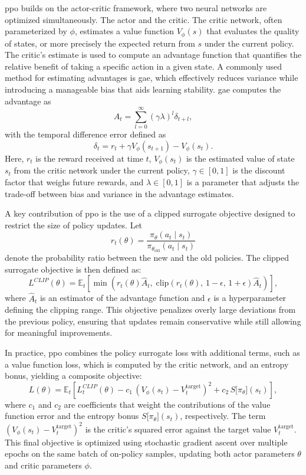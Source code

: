 \gls{ppo} builds on the actor-critic framework, where two neural networks are optimized simultaneously. The actor and the critic. The critic network, often parameterized by \(\phi\), estimates a value function \(V_\phi(s)\) that evaluates the quality of states, or more precisely the expected return from \(s\) under the current policy. The critic's estimate is used to compute an advantage function that quantifies the relative benefit of taking a specific action in a given state. A commonly used method for estimating advantages is \gls{gae}, which effectively reduces variance while introducing a manageable bias that aids learning stability. \gls{gae} computes the advantage as
\[
\hat{A}_t = \sum_{l=0}^{\infty} (\gamma \lambda)^l \delta_{t+l},
\]
with the temporal difference error defined as
\[
\delta_t = r_t + \gamma V_\phi(s_{t+1}) - V_\phi(s_t).
\]
Here, \(r_t\) is the reward received at time \(t\), \(V_\phi(s_t)\) is the estimated value of state \(s_t\) from the critic network under the current policy, \(\gamma \in [0,1]\) is the discount factor that weighs future rewards, and \(\lambda \in [0,1]\) is a parameter that adjusts the trade-off between bias and variance in the advantage estimates.

A key contribution of \gls{ppo} is the use of a clipped surrogate objective designed to restrict the size of policy updates. Let
\[
r_t(\theta) = \frac{\pi_\theta(a_t \mid s_t)}{\pi_{\theta_{\text{old}}}(a_t \mid s_t)}
\]
denote the probability ratio between the new and the old policies. The clipped surrogate objective is then defined as:
\[
L^{CLIP}(\theta) = \mathbb{E}_t\!\left[\min\!\left(r_t(\theta)\hat{A}_t,\;\text{clip}\left(r_t(\theta),\,1-\epsilon,\,1+\epsilon\right)\hat{A}_t\right)\right],
\]
where \(\hat{A}_t\) is an estimator of the advantage function and \(\epsilon\) is a hyperparameter defining the clipping range. This objective penalizes overly large deviations from the previous policy, ensuring that updates remain conservative while still allowing for meaningful improvements.

In practice, \gls{ppo} combines the policy surrogate loss with additional terms, such as a value function loss, which is computed by the critic network, and an entropy bonus, yielding a composite objective:
\[
L(\theta) = \mathbb{E}_t \left[ L^{CLIP}_t(\theta) - c_1\, \left(V_\phi(s_t) - V_t^{\text{target}}\right)^2 + c_2\, S\big[\pi_\theta\big](s_t) \right],
\]
where \(c_1\) and \(c_2\) are coefficients that weight the contributions of the value function error and the entropy bonus \(S\big[\pi_\theta\big](s_t)\), respectively. The term \(\left(V_\phi(s_t) - V_t^{\text{target}}\right)^2\) is the critic's squared error against the target value \(V_t^{\text{target}}\). This final objective is optimized using stochastic gradient ascent over multiple epochs on the same batch of on-policy samples, updating both actor parameters \(\theta\) and critic parameters \(\phi\).

